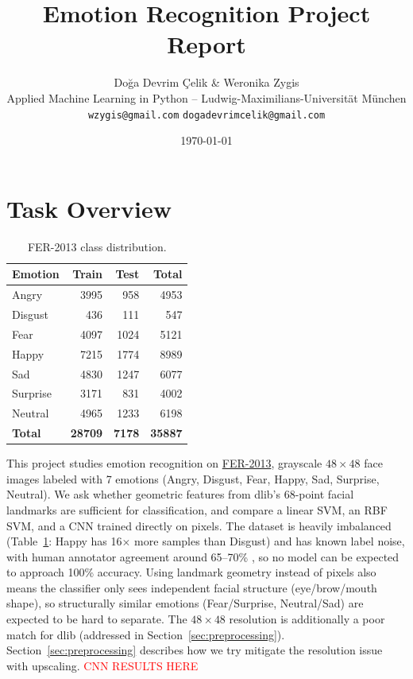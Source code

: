 \documentclass[10pt]{article}
\title{\textbf{\large Emotion Recognition Project Report}}
\author{\small Doğa Devrim Çelik \& Weronika Zygis \\
\small Applied Machine Learning in Python -- Ludwig-Maximilians-Universität München \\
\small \texttt{wzygis@gmail.com} \quad \texttt{dogadevrimcelik@gmail.com}}
\date{\vspace{-1em}\small\today}
\begin{document}
\maketitle
\vspace{-1.5em}
\section{Task Overview}
\begin{table}
\centering
\vspace{-1.4em}
\small
\begin{tabular}{lrrr}
\toprule
\textbf{Emotion} & \textbf{Train} & \textbf{Test} & \textbf{Total}\\
\midrule
Angry    & 3995  & 958  & 4953\\
Disgust  & 436   & 111  & 547\\
Fear     & 4097  & 1024 & 5121\\
Happy    & 7215  & 1774 & 8989\\
Sad      & 4830  & 1247 & 6077\\
Surprise & 3171  & 831  & 4002\\
Neutral  & 4965  & 1233 & 6198\\
\midrule
\textbf{Total} & \textbf{28709} & \textbf{7178} & \textbf{35887}\\
\bottomrule
\end{tabular}
\caption{\small FER-2013 class distribution.}
\label{tab:fer_distribution}
\end{table}
This project studies emotion recognition on \href{https://www.kaggle.com/datasets/msambare/fer2013/data}{FER-2013}, grayscale $48\times48$ face images labeled with 7 emotions (Angry, Disgust, Fear, Happy, Sad, Surprise, Neutral). We ask whether geometric features from dlib's 68-point facial landmarks are sufficient for classification, and compare a linear SVM, an RBF SVM, and a CNN trained directly on pixels.
The dataset is heavily imbalanced (Table~\ref{tab:fer_distribution}: Happy has 16$\times$ more samples than Disgust) and has known label noise, with human annotator agreement around 65--70\% \cite{goodfellow2013challenges}, so no model can be expected to approach 100\% accuracy. Using landmark geometry instead of pixels also means the classifier only sees independent facial structure (eye/brow/mouth shape), so structurally similar emotions (Fear/Surprise, Neutral/Sad) are expected to be hard to separate. The $48\times48$ resolution is additionally a poor match for dlib (addressed in Section~\ref{sec:preprocessing}). Section~\ref{sec:preprocessing} describes how we try mitigate the resolution issue with upscaling. \textcolor{red}{CNN RESULTS HERE}
\end{document}
